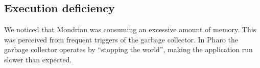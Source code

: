 \documentclass[10pt, conference, compsocconf]{IEEEtran}
\newcommand{\figref}[1]{Figure~\ref{fig:#1}}
\begin{document}
%
%

\subsection{Execution deficiency}

We noticed that Mondrian was consuming an excessive amount of memory. This was perceived from frequent triggers of the garbage collector. In Pharo the garbage collector operates by ``stopping the world'', making the application run slower than expected.
\end{document}
